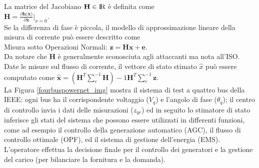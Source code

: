 La matrice del Jacobiano $\textbf{H} \in {\rm I\!R}$ è definita come\\
\indent$\textbf{H}=\frac{\partial\textbf{h(x)}}{\partial\textbf{x}}|_{x=0}$.\\
Se la differenza di fase è piccola, il modello di approssimazione lineare della misura di corrente può essere descritto come\\
\indent Misura sotto Operazioni Normali: $\textbf{z} =  \textbf{Hx} + \textbf{e}$.\\
Da notare che $\textbf{H}$ è generalmente sconosciuta agli attaccanti ma nota all'ISO. Date le misure sul flusso di corrente, il vettore di stato stimato $\widehat{x}$ può essere computato come $\widehat{\textbf{x}} = (\textbf{H}^T\sum_e^{-1}\textbf{H})-1\textbf{H}^T\sum_e^{-1}\textbf{z}$.\\
La Figura \ref{fourbuspowernet_img} mostra il sistema di test a quattro bus della IEEE: ogni bus ha il corrispondente voltaggio ($V_q$) e l'angolo di fase ($\theta_q$); il centro di controllo invia i dati delle misurazioni ($z_{qr}$) ed in seguito lo stimatore di stato inferisce gli stati del sistema che possono essere utilizzati in differenti funzioni, come ad esempio il controllo della generazione automatico (AGC), il flusso di controllo ottimale (OPF), ed il sistema di gestione dell'energia (EMS). L'operatore effettua la decisione finale per il controllo dei generatori e la gestione del carico (per bilanciare la fornitura e la domanda).
